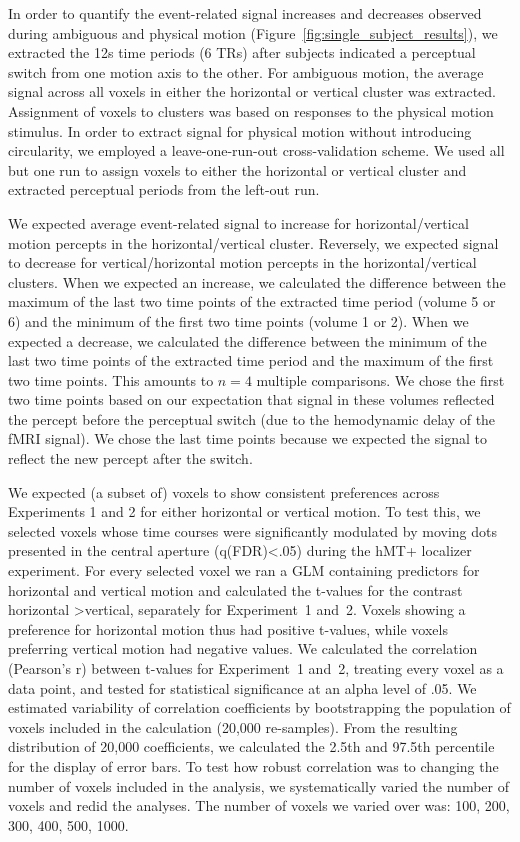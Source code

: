 In order to quantify the event-related signal increases and decreases observed during ambiguous and physical motion (Figure~\ref{fig:single_subject_results}), we extracted the 12s time periods (6 TRs) after subjects indicated a perceptual switch from one motion axis to the other. For ambiguous motion, the average signal across all voxels in either the horizontal or vertical cluster was extracted. Assignment of voxels to clusters was based on responses to the physical motion stimulus. In order to extract signal for physical motion without introducing circularity, we employed a leave-one-run-out cross-validation scheme. We used all but one run to assign voxels to either the horizontal or vertical cluster and extracted perceptual periods from the left-out run.

We expected average event-related signal to increase for horizontal/vertical motion percepts in the horizontal/vertical cluster. Reversely, we expected signal to decrease for vertical/horizontal motion percepts in the horizontal/vertical clusters. When we expected an increase, we calculated the difference between the maximum of the last two time points of the extracted time period (volume 5 or 6) and the minimum of the first two time points (volume 1 or 2). When we expected a decrease, we calculated the difference between the minimum of the last two time points of the extracted time period and the maximum of the first two time points. This amounts to $n=4$ multiple comparisons. We chose the first two time points based on our expectation that signal in these volumes reflected the percept before the perceptual switch (due to the hemodynamic delay of the fMRI signal). We chose the last time points because we expected the signal to reflect the new percept after the switch.

We expected (a subset of) voxels to show consistent preferences across Experiments 1 and 2 for either horizontal or vertical motion. To test this, we selected voxels whose time courses were significantly modulated by moving dots presented in the central aperture (q(FDR)\textless.05) during the hMT+ localizer experiment. For every selected voxel we ran a GLM containing predictors for horizontal and vertical motion and calculated the t-values for the contrast horizontal \textgreater vertical, separately for Experiment~1 and~2. Voxels showing a preference for horizontal motion thus had positive t-values, while voxels preferring vertical motion had negative values. We calculated the correlation (Pearson's r) between t-values for Experiment~1 and~2, treating every voxel as a data point, and tested for statistical significance at an alpha level of .05. We estimated variability of correlation coefficients by bootstrapping the population of voxels included in the calculation (20,000 re-samples). From the resulting distribution of 20,000 coefficients, we calculated the 2.5th and 97.5th percentile for the display of error bars. To test how robust correlation was to changing the number of voxels included in the analysis, we systematically varied the number of voxels and redid the analyses. The number of voxels we varied over was: 100, 200, 300, 400, 500, 1000.

